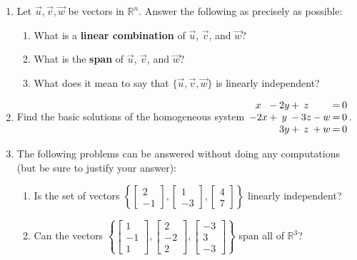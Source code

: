 \documentclass[12pt]{article}
\newcommand{\R}{\mathbb{R}}
\newcommand{\bbm}{\begin{bmatrix}}
\newcommand{\ebm}{\end{bmatrix}}
\begin{document}
 \begin{enumerate}
\item Let $\vec{u},\vec{v},\vec{w}$ be vectors in $\R^n$. Answer the following as precisely as possible:
\begin{enumerate}
\item What is a \textbf{linear combination} of $\vec{u}$, $\vec{v}$, and $\vec{w}$?

\vspace{1in}

\item What is the \textbf{span} of $\vec{u}$, $\vec{v}$, and $\vec{w}$?

\vspace{1in}

\item What does it mean to say that $\{\vec{u},\vec{v},\vec{w}\}$ is linearly independent?

\vspace{1in}


\end{enumerate}
\item Find the basic solutions of the homogeneous system \hspace{24pt} $\arraycolsep1pt
\begin{array}{ccccccccc}
x&-&2y&+&z& & &=&0\\
-2x&+&y&-&3z&-&w&=&0\\
 & &3y&+&z&+&w&=&0
\end{array}
$.
\newpage

\item The following problems can be answered without doing any computations (but be sure to justify your answer):
\begin{enumerate}
\item Is the set of vectors $\left\{\bbm 2\\-1\ebm, \bbm 1\\-3\ebm, \bbm 4\\7\ebm\right\}$ linearly independent?

\vspace{1in}

\item Can the vectors $\left\{\bbm 1\\-1\\1\ebm, \bbm 2\\-2\\2\ebm, \bbm -3\\3\\-3\ebm\right\}$ span all of $\R^3$?


\end{enumerate}
\end{enumerate}
\end{document}
